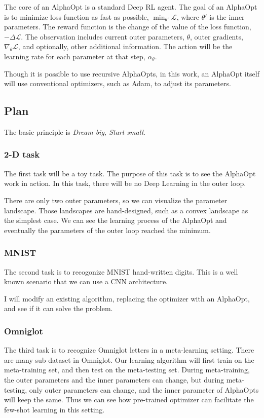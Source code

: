 The core of an AlphaOpt is a standard Deep RL agent.
The goal of an AlphaOpt is to minimize loss function as fast as possible, $\min_{\theta'} \mathcal{L}$, where $\theta'$ is the inner parameters.
The reward function is the change of the value of the loss function, $-\Delta \mathcal{L}$.
The observation includes current outer parameters, $\theta$, outer gradients, $\nabla_{\theta} \mathcal{L}$, and optionally, other additional information.
The action will be the learning rate for each parameter at that step, $\alpha_\theta$.

Though it is possible to use recursive AlphaOpts, in this work, an AlphaOpt itself will use conventional optimizers, such as Adam, to adjust its parameters.

\subsection{Plan}
The basic principle is \emph{Dream big, Start small}.

\subsubsection{2-D task}
The first task will be a toy task. The purpose of this task is to see the AlphaOpt work in action.
In this task, there will be no Deep Learning in the outer loop.

There are only two outer parameters, so we can visualize the parameter landscape. 
Those landscapes are hand-designed, such as a convex landscape as the simplest case.
We can see the learning process of the AlphaOpt and eventually the parameters of the outer loop reached the minimum.

\subsubsection{MNIST}
The second task is to recogonize MNIST hand-written digits.
This is a well known scenario that we can use a CNN architecture.

I will modify an existing algorithm, replacing the optimizer with an AlphaOpt, and see if it can solve the problem.

\subsubsection{Omniglot}
The third task is to recognize Omniglot letters in a meta-learning setting.
There are many sub-dataset in Omniglot. Our learning algorithm will first train on the meta-training set, and then test on the meta-testing set.
During meta-training, the outer parameters and the inner parameters can change, but during meta-testing, only outer parameters can change, and the inner parameter of AlphaOpts will keep the same.
Thus we can see how pre-trained optimizer can facilitate the few-shot learning in this setting.

